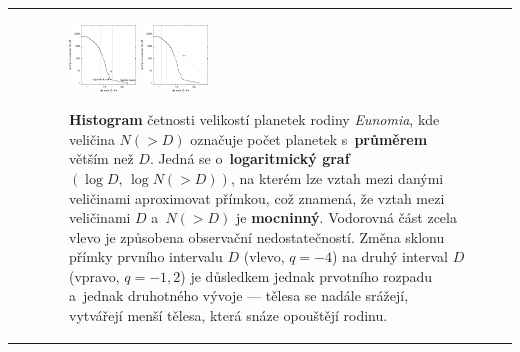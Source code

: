 \documentclass{beamer}
\newlength{\vyska}
\newlength{\vyskaB}
\newlength{\main}
\begin{document}
\begin{frame}
\begin{columns}[t]
\begin{column}{\main}
\begin{tcolorbox}[title=Výsledky\phantom{Úy},height=\vyskaB]
\begin{tabularx}{\textwidth}{p{}X}
	&

	\begin{figure}
		\centering
		\includegraphics[width=0.17\textwidth]{../obr/size_distribution-crop}
		\includegraphics[width=0.17\textwidth]{../obr/size_distribution_SMALLD-crop}
	\caption{\textbf{Histogram} četnosti velikostí planetek rodiny \textit{Eunomia}, kde veličina $N({>}D)$ označuje počet planetek s~\textbf{průměrem} větším než $D$. Jedná se o~\textbf{logaritmický graf} $(\log D,\,\log N({>}D))$, na kterém lze vztah mezi danými veličinami aproximovat přímkou, což znamená, že vztah mezi veličinami $D$ a~$N({>}D)$ je \textbf{mocninný}. Vodorovná část zcela vlevo je způsobena observační nedostatečností. Změna sklonu přímky prvního intervalu $D$ (vlevo, $q=-4$) na druhý interval $D$ (vpravo, $q=-1,2$) je důsledkem jednak prvotního rozpadu a~jednak druhotného vývoje --- tělesa se nadále srážejí, vytvářejí menší tělesa, která snáze opouštějí rodinu.}
		\label{fig:sfd}
	\end{figure}
	\end{tabularx}


\end{tcolorbox}
\end{column}
\end{columns}
\end{frame}
\end{document}
